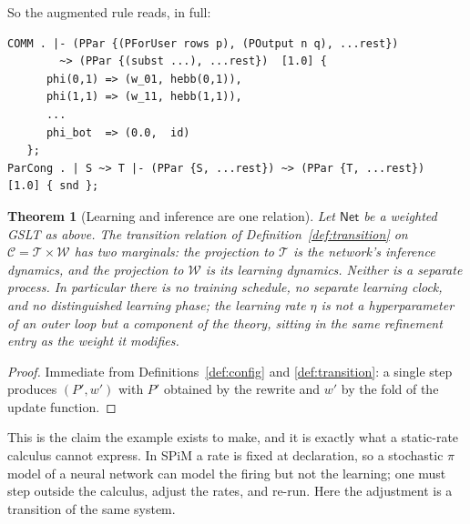 \documentclass[11pt,a4paper]{article}
\theoremstyle{plain}
\newtheorem{theorem}{Theorem}
\theoremstyle{definition}
\theoremstyle{remark}
\newcommand{\Terms}{\mathcal{T}}
\newcommand{\Cfg}{\mathcal{C}}
\newcommand{\Wt}{\mathcal{W}}
\newcommand{\wmap}{w}
\begin{document}
So the augmented rule reads, in full:
\begin{center}
\begin{minipage}{0.92\textwidth}
\begin{lstlisting}
COMM . |- (PPar {(PForUser rows p), (POutput n q), ...rest})
        ~> (PPar {(subst ...), ...rest})  [1.0] {
      phi(0,1) => (w_01, hebb(0,1)),
      phi(1,1) => (w_11, hebb(1,1)),
      ...
      phi_bot  => (0.0,  id)
   };
ParCong . | S ~> T |- (PPar {S, ...rest}) ~> (PPar {T, ...rest})  [1.0] { snd };
\end{lstlisting}
\end{minipage}
\end{center}

\begin{theorem}[Learning and inference are one relation]
\label{thm:one-relation}
Let $\mathsf{Net}$ be a weighted GSLT as above. The transition relation of
Definition~\ref{def:transition} on $\Cfg = \Terms \times \Wt$ has two marginals: the projection to
$\Terms$ is the network's inference dynamics, and the projection to $\Wt$ is its learning dynamics.
Neither is a separate process. In particular there is no training schedule, no separate learning
clock, and no distinguished learning phase; the learning rate $\eta$ is not a hyperparameter of an
outer loop but a component of the theory, sitting in the same refinement entry as the weight it
modifies.
\end{theorem}

\begin{proof}
Immediate from Definitions~\ref{def:config} and \ref{def:transition}: a single step produces
$(P', \wmap')$ with $P'$ obtained by the rewrite and $\wmap'$ by the fold of the update function.
\end{proof}

This is the claim the example exists to make, and it is exactly what a static-rate calculus cannot
express. In SPiM a rate is fixed at declaration, so a stochastic $\pi$ model of a neural network can
model the firing but not the learning; one must step outside the calculus, adjust the rates, and
re-run. Here the adjustment is a transition of the same system.
\end{document}
